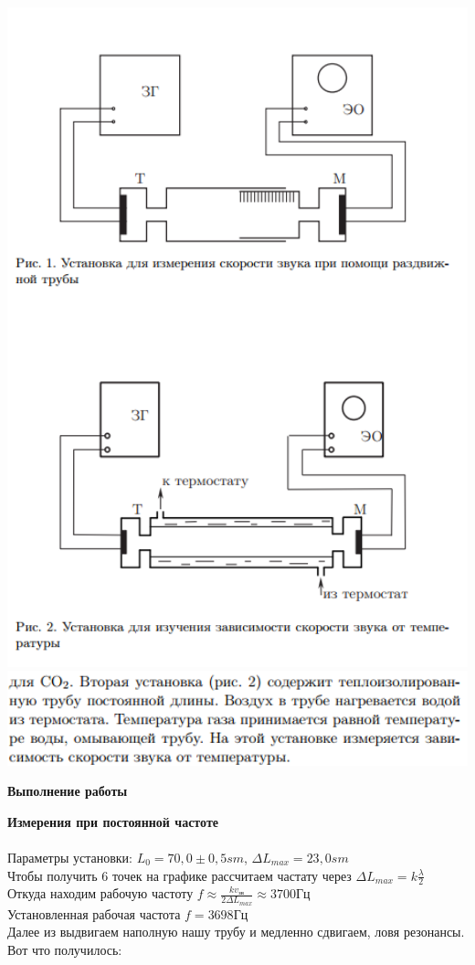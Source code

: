 \documentclass[12pt]{article}
\begin{document}
\begin{center}
    	\includegraphics[width=14cm]{theory_8.png}
    	\includegraphics[width=16cm]{theory_9.png}
    \end{center}
    \pagebreak
    \begin{center}
    	\textbf{\large{Выполнение работы}}
    \end{center}
    
    
    \textbf{Измерения при постоянной частоте}
    \\ \\
    Параметры установки: $L_0 = 70,0 \pm 0,5 sm$, $\Delta L_{max} = 23,0 sm$ \\
    Чтобы получить 6 точек на графике рассчитаем частату через $\Delta L_{max} = k\frac{\lambda}{2}$ \\
    Откуда находим рабочую частоту $f \approx \frac{k v_{зв}}{2\Delta L_{max}} \approx 3700 Гц$\\
    Установленная рабочая частота $f = 3698 Гц$\\
    Далее из выдвигаем наполную нашу трубу и медленно сдвигаем, ловя резонансы. Вот что получилось:\\
    
\end{document}
